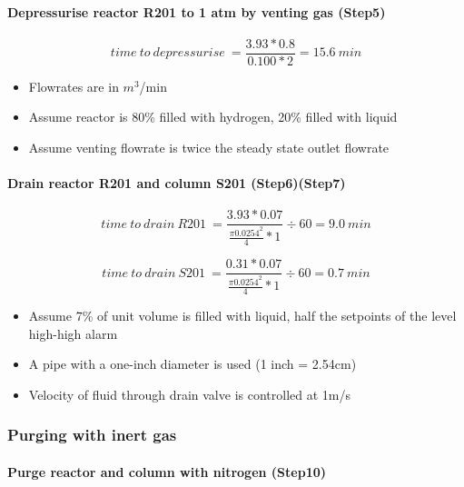 \paragraph{Depressurise reactor R201 to 1 atm by venting gas (Step5)}
    \begin{equation}
        time\:to\:depressurise\:=\frac{3.93 * 0.8}{0.100 * 2}=15.6\:min
    \end{equation}
    
    \begin{itemize}
        \item Flowrates are in $m^3$/min
        \item Assume reactor is 80\% filled with hydrogen, 20\% filled with liquid
        \item Assume venting flowrate is twice the steady state outlet flowrate
    \end{itemize}
    
 \paragraph{Drain reactor R201 and column S201 (Step6)(Step7)}   

    \begin{equation}
        time\:to\:drain\:R201\:=\frac{3.93 * 0.07}{\frac{\pi 0.0254^2}{4} * 1} \div 60 =9.0\:min
    \end{equation}
    
    \begin{equation}
        time\:to\:drain\:S201\:=\frac{0.31 * 0.07}{\frac{\pi 0.0254^2}{4} * 1} \div 60 =0.7\:min
    \end{equation}
    
    \begin{itemize}
        \item Assume 7\% of unit volume is filled with liquid, half the setpoints of the level high-high alarm
        \item A pipe with a one-inch diameter is used (1 inch = 2.54cm)
        \item Velocity of fluid through drain valve is controlled at 1m/s
    \end{itemize}

\subsubsection{Purging with inert gas} 
\paragraph{Purge reactor and column with nitrogen (Step10)}

